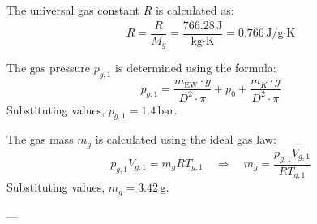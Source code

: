 The universal gas constant \( R \) is calculated as:  
\[
R = \frac{\bar{R}}{M_g} = \frac{766.28 \, \text{J}}{\text{kg·K}} = 0.766 \, \text{J}/\text{g·K}
\]

The gas pressure \( p_{g,1} \) is determined using the formula:  
\[
p_{g,1} = \frac{m_{\text{EW}} \cdot g}{D^2 \cdot \pi} + p_0 + \frac{m_K \cdot g}{D^2 \cdot \pi}
\]  
Substituting values, \( p_{g,1} = 1.4 \, \text{bar} \).

The gas mass \( m_g \) is calculated using the ideal gas law:  
\[
p_{g,1} V_{g,1} = m_g R T_{g,1} \quad \Rightarrow \quad m_g = \frac{p_{g,1} V_{g,1}}{R T_{g,1}}
\]  
Substituting values, \( m_g = 3.42 \, \text{g} \).

---